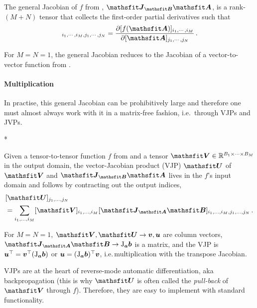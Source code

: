 \begin{definition}\label{def:general_jacobian}
  The general Jacobian of $f$ from , $\tJ_{\tB}\tA$, is a rank-$(M+N)$ tensor that collects the first-order partial derivatives such that
  \begin{align*}
    [\tJ_{\tA}\tB]_{i_1, \cdots, i_M, j_1, \cdots, j_N} = \frac{\partial [f(\tA)]_{i_1, \cdots, i_M}}{\partial [\tA]_{j_1, \cdots, j_N}}\,.
  \end{align*}
\end{definition}
For $M=N=1$, the general Jacobian reduces to the Jacobian of a vector-to-vector function from .

\paragraph{Multiplication} In practise, this general Jacobian can be prohibitively large and therefore one must almost always work with it in a matrix-free fashion, i.e.\, through VJPs and JVPs.

\switchcolumn[1]*
\switchcolumn[0]

\begin{definition}\label{def:vjp}
  Given a tensor-to-tensor function $f$ from  and a tensor $\tV \in \sR^{B_1 \times \dots \times B_M}$ in the output domain, the vector-Jacobian product (VJP) $\tU$ of $\tV$ and $\tJ_{\tB}\tA$ lives in the $f$'s input domain and follows by contracting out the output indices,
  \begin{align*}
     & [\tU]_{j_1, \dots, j_N}
    \\
     & =
    \sum_{i_1, \dots, i_M}
    [\tV]_{i_1, \dots, i_M}
    [\tJ_{\tA}\tB]_{i_1, \dots, i_M, j_1, \dots, j_N}\,.
  \end{align*}
\end{definition}
For $M=N=1$, $\tV, \tU \to \vv, \vu$ are column vectors, $\tJ_{\tA}\tB \to \jac_{\va}\vb$ is a matrix, and the VJP is ${\bm{u}}^{\top} = {\bm{v}}^{\top} (\mathrm{J}_{{\bm{a}}}{\bm{b}})$ or ${\bm{u}} = (\mathrm{J}_{{\bm{a}}}{\bm{b}})^{\top} {\bm{v}}$, i.e.\,multiplication with the transpose Jacobian.

VJPs are at the heart of reverse-mode automatic differentiation, aka backpropagation (this is why $\tU$ is often called the \emph{pull-back} of $\tV$ through $f$).
Therefore, they are easy to implement with standard functionality.

